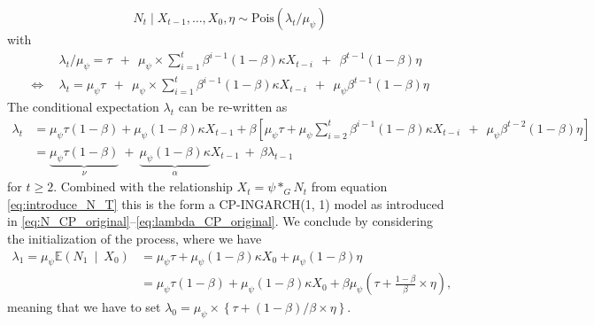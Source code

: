 \documentclass{article}
\begin{document}
$$
N_t \mid X_{t - 1}, \dots, X_0, \eta \sim \text{Pois}(\lambda_t/\mu_\psi)
$$
with
\begin{align*}
& \lambda_t/\mu_\psi = \tau \ \ + \ \ \mu_\psi \times \sum_{i = 1}^t \beta^{i - 1}(1 - \beta)\kappa X_{t - i} \ \ + \ \ \beta^{t - 1}(1 - \beta)\eta\\
\Leftrightarrow \ \ & \lambda_t = \mu_\psi \tau \ \ + \ \ \mu_\psi \times \sum_{i = 1}^t \beta^{i - 1}(1 - \beta)\kappa X_{t - i} \ \ + \ \ \mu_\psi\beta^{t - 1}(1 - \beta)\eta
\end{align*}
The conditional expectation $\lambda_t$ can be re-written as
\begin{align*}
\lambda_t & = \mu_\psi\tau(1 - \beta) + \mu_\psi(1 - \beta)\kappa X_{t - 1} + \beta \left[\mu_\psi\tau +   \mu_\psi \sum_{i = 2}^t \beta^{i - 1}(1 - \beta)\kappa X_{t - i}  \ \ + \ \ \mu_\psi\beta^{t - 2}(1 - \beta)\eta\right]\\
& = \underbrace{\mu_\psi\tau(1 - \beta)}_{\nu} \ + \ \underbrace{\mu_\psi(1 - \beta)\kappa}_{\alpha} X_{t - 1} \ + \ \beta \lambda_{t - 1}
\end{align*}
for $t \geq 2$. Combined with the relationship $X_t = \psi *_G N_t$ from equation \eqref{eq:introduce_N_T} this is the form a CP-INGARCH(1, 1) model as introduced in \eqref{eq:N_CP_original}--\eqref{eq:lambda_CP_original}. We conclude by considering the initialization of the process, where we have
\begin{align*}
\lambda_1 = \mu_\psi\mathbb{E}(N_1 \ \mid \ X_0) & = \mu_\psi\tau + \mu_\psi(1 - \beta)\kappa X_0 + \mu_\psi(1 - \beta)\eta\\ %
& = \mu_\psi \tau (1 - \beta) + \mu_\psi(1 - \beta)\kappa X_0 + \beta \mu_\psi \left(\tau + \frac{1 - \beta}{\beta} \times \eta \right),
\end{align*}
meaning that we have to set $\lambda_0 = \mu_\psi\times \left\{\tau + (1 - \beta)/\beta \times \eta\right\}$.

%
%
%
\end{document}
